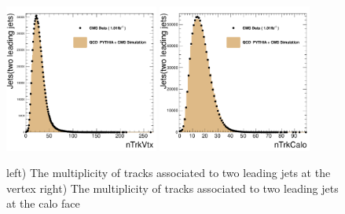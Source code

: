 \begin{figure}[!ht]
  \begin{center}
    \includegraphics[width=0.45\textwidth]{Figures/c_nTrkVtx.pdf}
    \includegraphics[width=0.45\textwidth]{Figures/c_nTrkCalo.pdf}
    \caption{ left) The multiplicity of tracks associated to two leading jets at the vertex right) The multiplicity of tracks associated to two leading jets at the calo face}
    \label{track_multiplicity}
  \end{center}
\end{figure}

